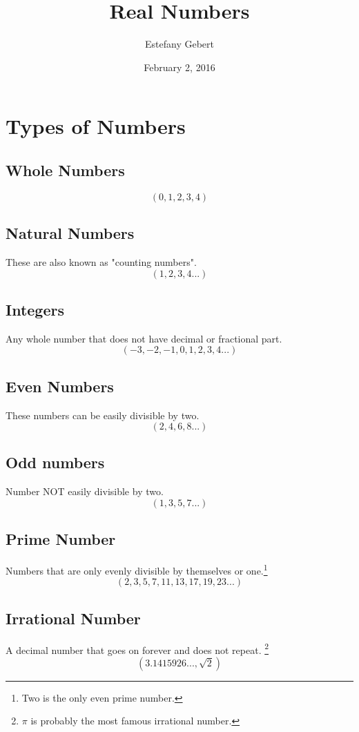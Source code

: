 \documentclass[]{article}
\title{Real Numbers}
\date{February 2, 2016}
\author{Estefany Gebert}
\begin{document}
\maketitle

\tableofcontents
\pagebreak

\section{Types of Numbers}
\subsection{Whole Numbers}
$$ (0,1,2,3,4)$$

\subsection{Natural Numbers}
These are also known as "counting numbers". $$(1,2,3,4...)$$

\subsection{Integers}
Any whole number that does not have decimal or fractional part.
$$(-3,-2,-1,0,1,2,3,4...)$$

\subsection{Even Numbers}
These numbers can be easily divisible by two.
$$(2,4,6,8...)$$

\subsection{Odd numbers}
Number NOT easily divisible by two.
$$(1,3,5,7...)$$

\subsection{Prime Number}
Numbers that are only evenly divisible by themselves or one.\footnote{Two is the only even prime number.}
$$(2,3,5,7,11,13,17,19,23...)$$

\subsection{Irrational Number}
A decimal number that goes on forever and does not repeat. \footnote{$\pi$ is probably the most famous irrational number.}
$$(3.1415926..., \sqrt 2)$$
\end{document}
